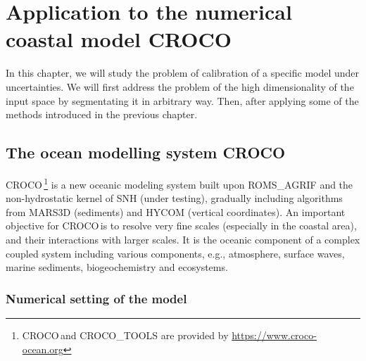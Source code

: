 \documentclass[../../Main_ManuscritThese.tex]{subfiles}
\newcommand{\CROCO}{CROCO\,}
\begin{document}
\chapter{Application to the numerical coastal model CROCO}
\label{chap:croco}
\minitoc
\subfileLocal{\pagestyle{contentStyle}}
In this chapter, we will study the problem of calibration of a
specific model under uncertainties. We will first address the problem
of the high dimensionality of the input space by segmentating it in
arbitrary way. Then, after applying some of the methods introduced in
the previous chapter.

\cite{boutet_estimation_2015}

\section{The ocean modelling system \CROCO}
\CROCO\footnote{\CROCO and CROCO\_TOOLS are provided by
  \url{https://www.croco-ocean.org}} is a new oceanic modeling system
built upon ROMS\_AGRIF and the non-hydrostatic kernel of SNH (under
testing), gradually including algorithms from MARS3D (sediments) and
HYCOM (vertical coordinates). An important objective for \CROCO is to
resolve very fine scales (especially in the coastal area), and their
interactions with larger scales. It is the oceanic component of a
complex coupled system including various components, e.g., atmosphere,
surface waves, marine sediments, biogeochemistry and ecosystems.
\cite{mcwilliams_irreducible_2007,zanna_ocean_2011}

\subsection{Numerical setting of the model}
\label{sec:geographical_setting}
\end{document}
